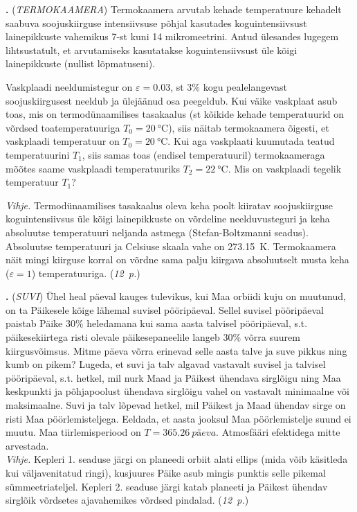 \documentclass[11pt,a5paper]{article}
\newcommand{\numb}[1]{\vspace{5pt}\textbf{\large #1}}
\newcommand{\nimi}[1]{(\textsl{\small #1})}
\newcommand{\punktid}[1]{(\emph{#1~p.})}
\newcommand{\autor}[1]{}
\newcounter{ylesanne}
\newcommand{\yl}[1]{\addtocounter{ylesanne}{1}\numb{\theylesanne.} \nimi{#1} \newblock{}}
\begin{document}
	
	\yl{TERMOKAAMERA}
	Termokaamera arvutab kehade temperatuure kehadelt saabuva soojuskiirguse intensiivsuse põhjal kasutades koguintensiivsust lainepikkuste vahemikus 7-st kuni 14 mikromeetrini. Antud ülesandes lugegem lihtsustatult, et arvutamiseks kasutatakse koguintensiivsust üle kõigi lainepikkuste (nullist lõpmatuseni). 
	
	Vaskplaadi neeldumistegur on $\varepsilon = \num{0.03}$, st 3\% kogu pealelangevast soojuskiirgusest neeldub ja ülejäänud osa peegeldub. Kui väike vaskplaat asub toas, mis on termodünaamilises tasakaalus (st kõikide kehade temperatuurid on võrdsed toatemperatuuriga $T_0=\SI {20}\celsius$), siis näitab termokaamera õigesti, et vaskplaadi temperatuur on $T_0=\SI {20}\celsius$. Kui aga  vaskplaati kuumutada teatud temperatuurini $T_1$, siis samas toas (endisel temperatuuril) termokaameraga mõõtes saame vaskplaadi temperatuuriks $T_2=\SI {22}\celsius$. Mis on vaskplaadi tegelik temperatuur $T_1$?
	
	\textit{Vihje.} Termodünaamilises tasakaalus oleva keha poolt kiiratav soojuskiirguse koguintensiivsus üle kõigi lainepikkuste on võrdeline neelduvusteguri ja keha absoluutse temperatuuri neljanda astmega (Stefan-Boltzmanni seadus). Absoluutse temperatuuri ja Celsiuse skaala vahe on \SI{273.15}{K}. Termokaamera näit mingi kiirguse korral on võrdne sama palju kiirgava absoluutselt musta keha ($\varepsilon = 1$) temperatuuriga.
	\punktid{12} \autor{Jaan Kalda}

	
	\newpage
	
	
	
	\yl{SUVI}
	Ühel heal päeval kauges tulevikus, kui Maa orbiidi kuju on muutunud, on ta Päikesele
	kõige lähemal suvisel pööripäeval. Sellel suvisel pööripäeval paistab Päike $30\%$
	heledamana kui sama aasta talvisel pööripäeval, s.t. päikesekiirtega risti olevale
	päikesepaneelile langeb $30\%$ võrra suurem kiirgusvõimsus. Mitme päeva võrra erinevad
	selle aasta talve ja suve pikkus ning kumb on pikem? Lugeda, et suvi ja talv algavad
	vastavalt suvisel ja talvisel pööripäeval, s.t. hetkel, mil nurk Maad ja Päikest ühendava
	sirglõigu ning Maa keskpunkti ja põhjapoolust ühendava sirglõigu vahel on vastavalt
	minimaalne või maksimaalne. Suvi ja talv lõpevad hetkel, mil Päikest ja Maad ühendav
	sirge on risti Maa pöörlemisteljega. Eeldada, et aasta jooksul Maa pöörlemistelje suund ei muutu. Maa tiirlemisperiood on $T=\SI{365.26}{päeva}$.
	Atmosfääri efektidega mitte arvestada.\\
	\textit{Vihje.} Kepleri 1. seaduse järgi on planeedi orbiit alati ellips (mida võib käsitleda kui väljavenitatud ringi), kusjuures Päike asub mingis punktis selle pikemal sümmeetriateljel. Kepleri 2. seaduse järgi katab planeeti ja Päikest ühendav sirglõik
	võrdsetes ajavahemikes võrdsed pindalad.
	\punktid{12} \autor{Erik Tamre}
	
\end{document}
